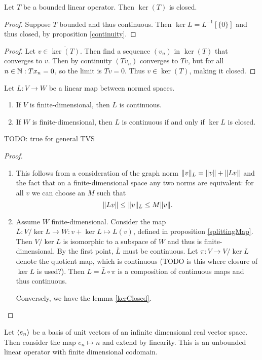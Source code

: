 \begin{lemma} \label{kerClosed}
Let $T$ be a bounded linear operator. Then $\ker(T)$ is closed.
\end{lemma}
\begin{proof}
Suppose $T$ bounded and thus continuous. Then $\ker L = L^{-1}[\{0\}]$ and thus closed, by proposition \ref{continuity}.
\end{proof}
\begin{proof}
Let $v\in \overline{\ker(T)}$. Then find a sequence $(v_n)$ in $\ker(T)$ that converges to $v$. Then by continuity $(Tv_n)$ converges to $Tv$, but for all $n\in\mathbb{N}: Tx_n = 0$, so the limit is $Tv=0$. Thus $v\in\ker(T)$, making it closed.
\end{proof}

\begin{proposition}\label{continuousMapCriterion}
Let $L:V\to W$ be a linear map between normed spaces.
\begin{enumerate}
\item If $V$ is finite-dimensional, then $L$ is continuous.
\item If $W$ is finite-dimensional, then $L$ is continuous \textup{if and only if} $\ker L$ is closed.
\end{enumerate}
\end{proposition}
TODO: true for general TVS
\begin{proof}
\begin{enumerate}
\item This follows from a consideration of the graph norm $\lVert v\rVert_L = \lVert v\rVert+\lVert Lv\rVert$ and the fact that on a finite-dimensional space any two norms are equivalent: for all $v$ we can choose an $M$ such that
\[ \lVert Lv\rVert\leq \lVert v\rVert_L \leq M\lVert v\rVert. \]
\item Assume $W$ finite-dimensional. Consider the map $\bar{L}:V/\ker L\to W: v+\ker{L}\mapsto L(v)$, defined in proposition \ref{splittingMap}. Then $V/\ker L$ is isomorphic to a subspace of $W$ and thus is finite-dimensional. By the first point, $\bar{L}$ must be continuous. Let $\pi: V\to V/\ker L$ denote the quotient map, which is continuous (TODO is this where closure of $\ker L$ is used?). Then $L = \bar{L}\circ \pi$ is a composition of continuous maps and thus continuous.

Conversely, we have the lemma \ref{kerClosed}.
\end{enumerate}
\end{proof}

\begin{example}
Let $\left\langle e_n \right\rangle$ be a basis of unit vectors of an infinite dimensional real vector space. Then consider the map $e_n\mapsto n$ and extend by linearity. This is an unbounded linear operator with finite dimensional codomain.
\end{example}


